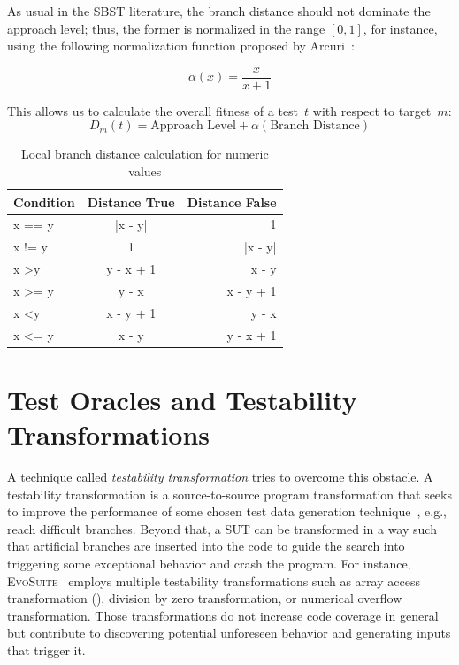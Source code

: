 \documentclass[paper=a4,%
  twoside,%
  BCOR4mm,%
  abstract=true,%
  toc=bibliography,%
  chapterprefix=true,%
  toc=bibliographynumbered,%
  open=right,%
  english,%
  pagesize=pdftex]{scrreprt}
\newcommand{\sut}{\ac{SUT}\xspace}
\begin{document}
As usual in the \ac{SBST} literature, the branch distance should not dominate the approach level; thus, the former is normalized in the range $[0, 1]$, for instance, using the following normalization function proposed by Arcuri~\cite{Arcuri_2011}:

\[\alpha(x) = \frac{x}{x + 1}\]

This allows us to calculate the overall fitness of a test~$t$ with respect to target~$m$:
\[D_m(t) = \text{Approach Level} + \alpha(\text{Branch Distance})\]

\begin{table}[]
\centering
\begin{tabular}{lcr}
\hline
\textbf{Condition}  & \textbf{Distance True} & \textbf{Distance False} \\
\hline
x == y              & |x - y|                & 1                       \\
x != y              & 1                      & |x - y|                 \\
x \textgreater y    & y - x + 1              & x - y                   \\
x \textgreater{}= y & y - x                  & x - y + 1               \\
x \textless y       & x - y + 1              & y - x                   \\
x \textless{}= y    & x - y                  & y - x + 1               \\ \hline
\end{tabular}
\caption{Local branch distance calculation for numeric values}
\label{tab:local-branch-distance-formulas}
\end{table}

\section{Test Oracles and Testability Transformations}
\label{sec:testability-transformations}

A technique called \emph{testability transformation} tries to overcome this obstacle. A testability transformation is a source-to-source program transformation that seeks to improve the performance of some chosen test data generation technique~\cite{Harman2004}, e.g., reach difficult branches. Beyond that, a \sut can be transformed in a way such that artificial branches are inserted into the code to guide the search into triggering some exceptional behavior and crash the program. For instance, \textsc{EvoSuite}~\cite{Fraser2013} employs multiple testability transformations such as array access transformation (), division by zero transformation, or numerical overflow transformation. Those transformations do not increase code coverage in general but contribute to discovering potential unforeseen behavior and generating inputs that trigger it.
\end{document}
